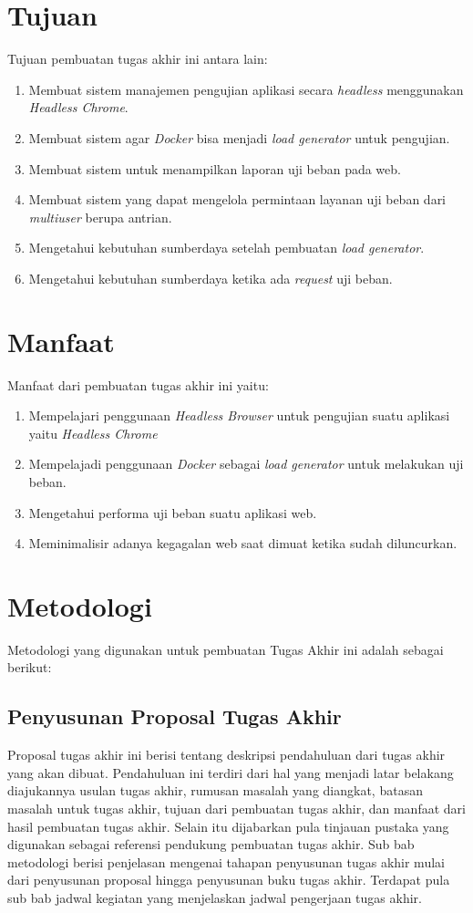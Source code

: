 	\section{Tujuan}
       	Tujuan pembuatan tugas akhir ini antara lain:
       	\begin{enumerate}
       		\item Membuat sistem manajemen pengujian aplikasi secara \textit{headless} menggunakan \textit{Headless Chrome}.
       		\item Membuat sistem agar \textit{Docker} bisa menjadi \textit{load generator} untuk pengujian.
       		\item Membuat sistem untuk menampilkan laporan uji beban pada web.
       		\item Membuat sistem yang dapat mengelola permintaan layanan uji beban dari \textit{multiuser} berupa antrian.
       		\item Mengetahui kebutuhan sumberdaya setelah pembuatan \textit{load generator}.
       		\item Mengetahui kebutuhan sumberdaya ketika ada \textit{request} uji beban.
       	\end{enumerate}
        
	\section{Manfaat}
		Manfaat dari pembuatan tugas akhir ini yaitu:
		\begin{enumerate}
			\item Mempelajari penggunaan \textit{Headless Browser} untuk pengujian suatu aplikasi yaitu \textit{Headless Chrome}
			\item Mempelajadi penggunaan \textit{Docker} sebagai \textit{load generator} untuk melakukan uji beban.
			\item Mengetahui performa uji beban suatu aplikasi web.
			\item Meminimalisir adanya kegagalan web saat dimuat ketika sudah diluncurkan.
		\end{enumerate}
	
	\section{Metodologi}
		Metodologi yang digunakan untuk pembuatan Tugas Akhir ini adalah sebagai berikut:	
		\subsection{Penyusunan Proposal Tugas Akhir}
			Proposal tugas akhir ini berisi tentang deskripsi pendahuluan dari tugas
			akhir yang akan dibuat. Pendahuluan ini terdiri dari hal yang menjadi latar
			belakang diajukannya usulan tugas akhir, rumusan masalah yang diangkat,
			batasan masalah untuk tugas akhir, tujuan dari pembuatan tugas akhir, dan
			manfaat dari hasil pembuatan tugas akhir. Selain itu dijabarkan pula tinjauan
			pustaka yang digunakan sebagai referensi pendukung pembuatan tugas akhir.
			Sub bab metodologi berisi penjelasan mengenai tahapan penyusunan tugas
			akhir mulai dari penyusunan proposal hingga penyusunan buku tugas akhir.
			Terdapat pula sub bab jadwal kegiatan yang menjelaskan jadwal pengerjaan
			tugas akhir.	
